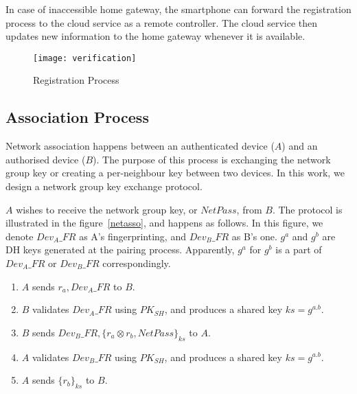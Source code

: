 In case of inaccessible home gateway, the smartphone can forward the registration process to the cloud service as a remote controller. The cloud service then updates new information to the home gateway whenever it is available. 
\begin{figure}
  \centering
  \texttt{[image: verification]}
  \caption{Registration Process}
  \label{registration}
\end{figure}

\subsection{Association Process}

Network association happens between an authenticated device ($A$) and an authorised device ($B$). The purpose of this process is exchanging the network group key or creating a per-neighbour key between two devices. In this work, we design a network group key exchange protocol.

$A$ wishes to receive the network group key, or $NetPass$, from $B$. The protocol is illustrated in the figure~\ref{netasso}, and happens as follows. In this figure, we denote $Dev_{A}\_FR$ as A's fingerprinting, and $Dev_{B}\_FR$ as B's one. $g^a$ and $g^b$ are DH keys generated at the pairing process. Apparently, $g^a$ for $g^b$ is a part of $Dev_{A}\_FR$ or $Dev_{B}\_FR$ correspondingly. 

\begin{enumerate}
\item $A$ sends $r_a, Dev_{A}\_FR$ to $B$. 
\item $B$ validates $Dev_{A}\_FR$ using $PK_{SH}$, and produces a shared key $ks = g^{a.b}$.
\item $B$ sends $Dev_{B}\_FR,\{r_a \otimes r_b, NetPass \}_{ks}$ to $A$.
\item $A$ validates $Dev_{B}\_FR$ using  $PK_{SH}$, and produces a shared key $ks = g^{a.b}$.
\item $A$ sends $\{r_b\}_{ks}$ to $B$.
\end{enumerate}


